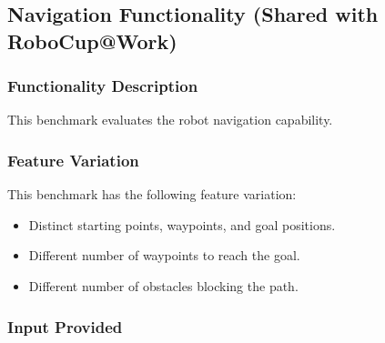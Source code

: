 
\subsection{Navigation Functionality (Shared with RoboCup@Work)}
\label{ssec:Navigation}

\subsubsection{Functionality Description}
\label{sssec:FooOMDescription}

This benchmark evaluates the robot navigation capability.

\subsubsection{Feature Variation}
\label{sssec:FooOMVariation}

This benchmark has the following feature variation:
\begin{itemize}
  \item{Distinct starting points, waypoints, and goal positions.}
  \item{Different number of waypoints to reach the goal.}
  \item{Different number of obstacles blocking the path.}
\end{itemize}

\subsubsection{Input Provided}
\label{sssec:FooOMInput}

